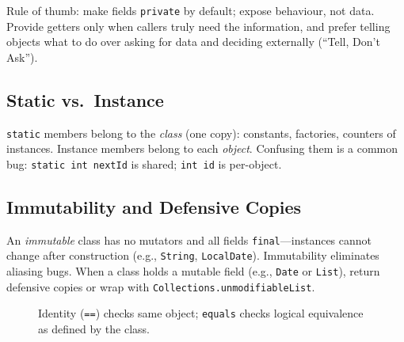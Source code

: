 Rule of thumb: make fields \texttt{private} by default; expose behaviour, not data. Provide getters only when callers truly need the information, and prefer telling objects what to do over asking for data and deciding externally (``Tell, Don't Ask'').

\subsection{Static vs.\ Instance}
\texttt{static} members belong to the \emph{class} (one copy): constants, factories, counters of instances. Instance members belong to each \emph{object}. Confusing them is a common bug: \texttt{static int nextId} is shared; \texttt{int id} is per-object.

\subsection{Immutability and Defensive Copies}
An \emph{immutable} class has no mutators and all fields \texttt{final}---instances cannot change after construction (e.g., \texttt{String}, \texttt{LocalDate}). Immutability eliminates aliasing bugs. When a class holds a mutable field (e.g., \texttt{Date} or \texttt{List}), return defensive copies or wrap with \texttt{Collections.unmodifiableList}.

\begin{figure}[h]
\centering
{}
\caption{Identity (\texttt{==}) checks same object; \texttt{equals} checks logical equivalence as defined by the class.}
\label{fig:identity-equality}
\end{figure}

